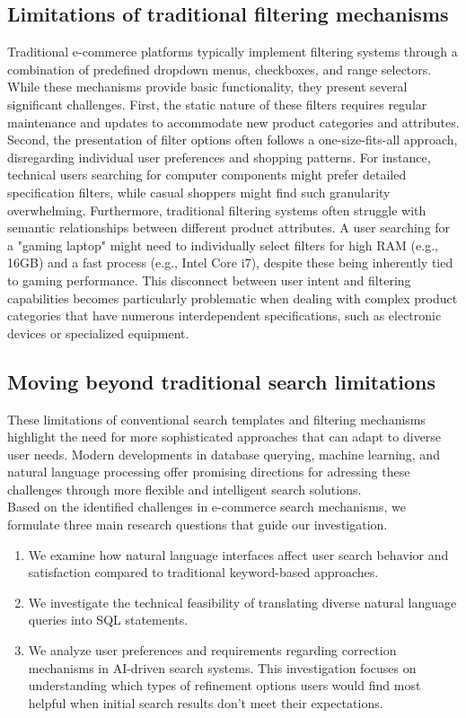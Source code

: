\documentclass[../../submission.tex]{subfiles}
\begin{document}
\subsection{Limitations of traditional filtering mechanisms}
Traditional e-commerce platforms typically implement filtering systems through a combination of 
predefined dropdown menus, checkboxes, and range selectors. While these mechanisms provide basic 
functionality, they present several significant challenges. First, the static nature of these 
filters requires regular maintenance and updates to accommodate new product categories and attributes. 
Second, the presentation of filter options often follows a one-size-fits-all approach, disregarding 
individual user preferences and shopping patterns. For instance, technical users searching for computer 
components might prefer detailed specification filters, while casual shoppers might find such granularity 
overwhelming. Furthermore, traditional filtering systems often struggle with semantic relationships between 
different product attributes. A user searching for a "gaming laptop" might need to individually select filters
for high RAM (e.g., 16GB) and a fast process (e.g., Intel Core i7), despite these being inherently tied to 
gaming performance. This disconnect between user intent and filtering 
capabilities becomes particularly problematic when dealing with complex product categories that 
have numerous interdependent specifications, such as electronic devices or specialized equipment.

\subsection{Moving beyond traditional search limitations}
These limitations of conventional search templates and filtering mechanisms highlight 
the need for more sophisticated approaches that can adapt to diverse user needs. 
Modern developments in database querying, machine learning, and natural language processing 
offer promising directions for adressing these challenges through more flexible and 
intelligent search solutions.\\
Based on the identified challenges in e-commerce search mechanisms, we formulate three main research 
questions that guide our investigation.
\begin{enumerate}
    \item We examine how natural language interfaces affect user search behavior and satisfaction 
    compared to traditional keyword-based approaches.
    \item We investigate the technical feasibility of translating diverse natural language queries into SQL statements.
    \item We analyze user preferences and requirements regarding correction mechanisms in AI-driven search systems. 
    This investigation focuses on understanding which types of refinement options users would find most helpful when 
    initial search results don't meet their expectations.
\end{enumerate}
\end{document}
